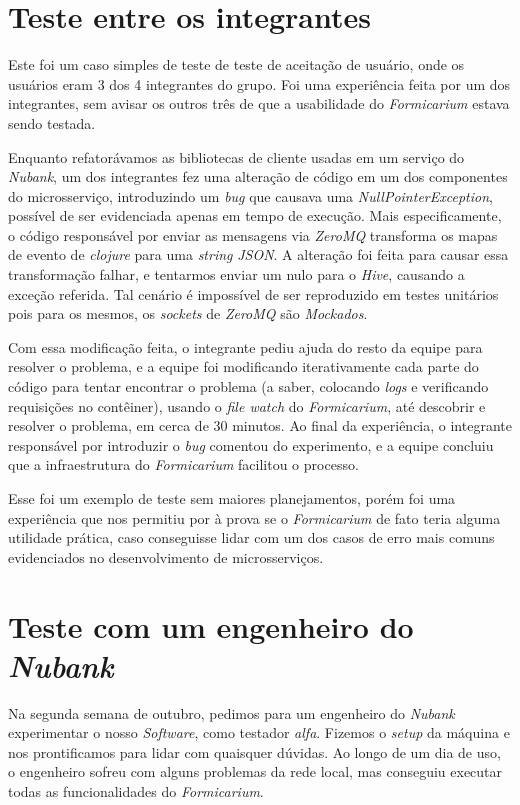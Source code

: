     \section{Teste entre os integrantes}
        Este foi um caso simples de teste de teste de aceitação de usuário, onde os usuários eram 3 dos 4 integrantes do grupo. Foi uma experiência feita por um dos integrantes, sem avisar os outros três de que a usabilidade do \textit{Formicarium} estava sendo testada.
        
        Enquanto refatorávamos as bibliotecas de cliente usadas em um serviço do \textit{Nubank}, um dos integrantes fez uma alteração de código em um dos componentes do microsserviço, introduzindo um \textit{bug} que causava uma \textit{NullPointerException}, possível de ser evidenciada apenas em tempo de execução. Mais especificamente, o código responsável por enviar as mensagens via \textit{ZeroMQ} transforma os mapas de evento de \textit{clojure} para uma \textit{string} \textit{JSON}. A alteração foi feita para causar essa transformação falhar, e tentarmos enviar um nulo para o \textit{Hive}, causando a exceção referida. Tal cenário é impossível de ser reproduzido em testes unitários pois para os mesmos, os \textit{sockets} de \textit{ZeroMQ} são \textit{Mockados}.
        
        Com essa modificação feita, o integrante pediu ajuda do resto da equipe para resolver o problema, e a equipe foi modificando iterativamente cada parte do código para tentar encontrar o problema (a saber, colocando \textit{logs} e verificando requisições no contêiner), usando o \textit{file watch} do \textit{Formicarium}, até descobrir e resolver o problema, em cerca de 30 minutos. Ao final da experiência, o integrante responsável por introduzir o \textit{bug} comentou do experimento, e a equipe concluiu que a infraestrutura do \textit{Formicarium} facilitou o processo.
        
        Esse foi um exemplo de teste sem maiores planejamentos, porém foi uma experiência que nos permitiu por à prova se o \textit{Formicarium} de fato teria alguma utilidade prática, caso conseguisse lidar com um dos casos de erro mais comuns evidenciados no desenvolvimento de microsserviços.
    
    \section{Teste com um engenheiro do \textit{Nubank}}
        Na segunda semana de outubro, pedimos para um engenheiro do \textit{Nubank} experimentar o nosso \textit{Software}, como testador \textit{alfa}. Fizemos o \textit{setup} da máquina e nos prontificamos para lidar com quaisquer dúvidas. Ao longo de um dia de uso, o engenheiro sofreu com alguns problemas da rede local, mas conseguiu executar todas as funcionalidades do \textit{Formicarium}.
    
